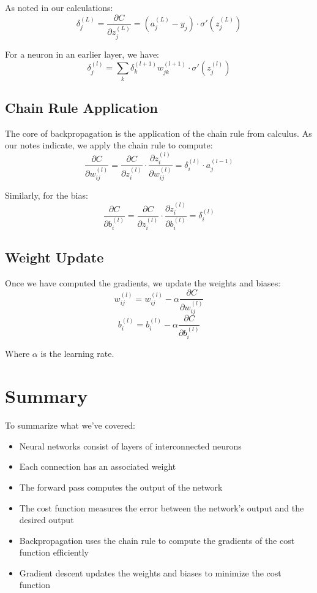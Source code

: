As noted in our calculations:
\begin{equation}
\delta_j^{(L)} = \frac{\partial C}{\partial z_j^{(L)}} = (a_j^{(L)} - y_j) \cdot \sigma'(z_j^{(L)})
\end{equation}

For a neuron in an earlier layer, we have:
\begin{equation}
\delta_j^{(l)} = \sum_k \delta_k^{(l+1)} w_{jk}^{(l+1)} \cdot \sigma'(z_j^{(l)})
\end{equation}

\subsection{Chain Rule Application}
The core of backpropagation is the application of the chain rule from calculus. As our notes indicate, we apply the chain rule to compute:
\begin{equation}
\frac{\partial C}{\partial w_{ij}^{(l)}} = \frac{\partial C}{\partial z_i^{(l)}} \cdot \frac{\partial z_i^{(l)}}{\partial w_{ij}^{(l)}} = \delta_i^{(l)} \cdot a_j^{(l-1)}
\end{equation}

Similarly, for the bias:
\begin{equation}
\frac{\partial C}{\partial b_i^{(l)}} = \frac{\partial C}{\partial z_i^{(l)}} \cdot \frac{\partial z_i^{(l)}}{\partial b_i^{(l)}} = \delta_i^{(l)}
\end{equation}

\subsection{Weight Update}
Once we have computed the gradients, we update the weights and biases:
\begin{equation}
w_{ij}^{(l)} = w_{ij}^{(l)} - \alpha \frac{\partial C}{\partial w_{ij}^{(l)}}
\end{equation}
\begin{equation}
b_i^{(l)} = b_i^{(l)} - \alpha \frac{\partial C}{\partial b_i^{(l)}}
\end{equation}

Where $\alpha$ is the learning rate.

\section{Summary}
To summarize what we've covered:
\begin{itemize}
    \item Neural networks consist of layers of interconnected neurons
    \item Each connection has an associated weight
    \item The forward pass computes the output of the network
    \item The cost function measures the error between the network’s output and the desired output
    \item Backpropagation uses the chain rule to compute the gradients of the cost function efficiently
    \item Gradient descent updates the weights and biases to minimize the cost function
\end{itemize}
